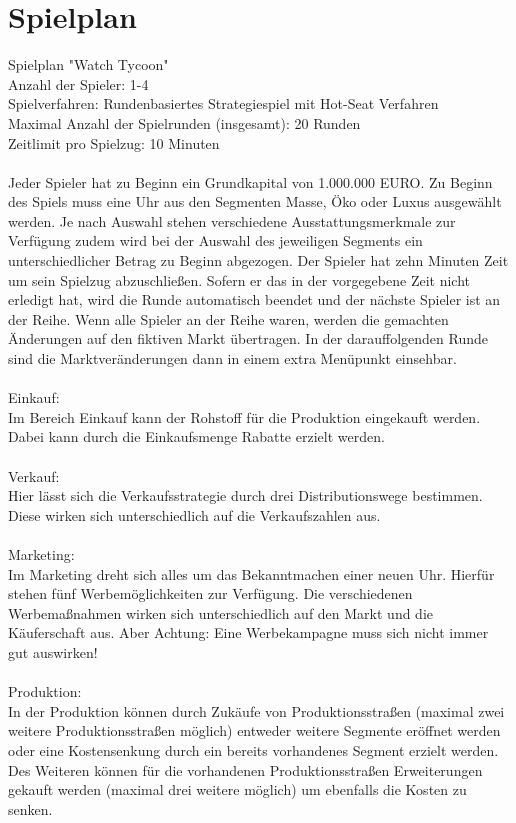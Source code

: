 \clearpage
\chapter{Spielplan}
Spielplan "Watch Tycoon" \\
Anzahl der Spieler: 1-4 \\
Spielverfahren: Rundenbasiertes Strategiespiel mit Hot-Seat Verfahren \\
Maximal Anzahl der Spielrunden (insgesamt): 20 Runden \\
Zeitlimit pro Spielzug: 10 Minuten \\
\\
Jeder Spieler hat zu Beginn ein Grundkapital von 1.000.000 EURO. Zu Beginn des Spiels muss eine Uhr aus den Segmenten Masse, Öko oder Luxus ausgewählt werden. Je nach Auswahl stehen verschiedene Ausstattungsmerkmale zur Verfügung zudem wird bei der Auswahl des jeweiligen Segments ein unterschiedlicher Betrag zu Beginn abgezogen. Der Spieler hat zehn Minuten Zeit um sein Spielzug abzuschließen. Sofern er das in der vorgegebene Zeit nicht erledigt hat, wird die Runde automatisch beendet und der nächste Spieler ist an der Reihe. Wenn alle Spieler an der Reihe waren, werden die gemachten Änderungen auf den fiktiven Markt übertragen. In der darauffolgenden Runde sind die Marktveränderungen dann in einem extra Menüpunkt einsehbar. \\ 
\\
Einkauf:\\
Im Bereich Einkauf kann der Rohstoff für die Produktion eingekauft werden. Dabei kann durch die Einkaufsmenge Rabatte erzielt werden. \\
\\
Verkauf: \\
Hier lässt sich die Verkaufsstrategie durch drei Distributionswege bestimmen. Diese wirken sich unterschiedlich auf die Verkaufszahlen aus.\\
\\
Marketing:\\
Im Marketing dreht sich alles um das Bekanntmachen einer neuen Uhr. Hierfür stehen fünf Werbemöglichkeiten zur Verfügung. Die verschiedenen Werbemaßnahmen wirken sich unterschiedlich auf den Markt und die Käuferschaft aus. Aber Achtung: Eine Werbekampagne muss sich nicht immer gut auswirken!\\ 
\\
Produktion: \\
In der Produktion können durch Zukäufe von Produktionsstraßen (maximal zwei weitere Produktionsstraßen möglich) entweder weitere Segmente eröffnet werden oder eine Kostensenkung durch ein bereits vorhandenes Segment erzielt werden. Des Weiteren können für die vorhandenen Produktionsstraßen Erweiterungen gekauft werden (maximal drei weitere möglich) um ebenfalls die Kosten zu senken. \\ 
